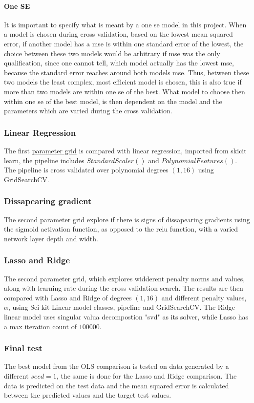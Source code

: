 \paragraph{One SE}
It is important to specify what is meant by a one se model in this project. 
When a model is chosen during cross validation, based on the lowest mean squared
error, if another model has a mse is within one standard error of the lowest, 
the choice between these two models would be arbitrary if mse was the only qualification,
since one cannot tell, which model actually has the lowest mse, because the standard
error reaches around both models mse. Thus, between these two models 
the least complex, most efficient model is chosen, this is also true
if more than two models are within one se of the best. What model to choose then
within one se of the best model, is then dependent on the model and the
parameters which are varied during the cross validation.
\subsubsection{Linear Regression}
The first \hyperref[tab:ParamGrid1]{parameter grid} is compared 
with linear regression, imported from skicit learn, the pipeline includes
$StandardScaler()$ and $PolynomialFeatures()$. The pipeline is 
cross validated over polynomial degrees $(1,16)$ using GridSearchCV. 
\subsubsection{Dissapearing gradient}
The second parameter grid explore if there is signs of 
dissapearing gradients using the sigmoid activation function, as opposed
to the relu function, with a varied network layer depth and width.
\subsubsection{Lasso and Ridge}
The second parameter grid, which explores widderent penalty norms and values,
along with learning rate during the cross validation search. The results are 
then compared with Lasso and Ridge of degrees $(1, 16)$ and different 
penalty values, $\alpha$, using Sci-kit Linear model classes, pipeline and GridSearchCV. 
The Ridge linear model uses singular valua decompostion "svd" as its solver, while 
Lasso has a max iteration count of $100000$.
\subsubsection{Final test}
The best model from the OLS comparison is tested on data generated by a different
$seed = 1$, the same is done for the Lasso and Ridge comparison. The data is 
predicted on the test data and the mean squared error is calculated between
the predicted values and the target test values. 

